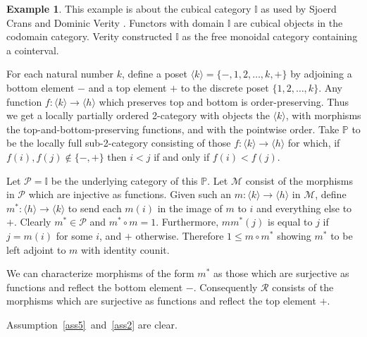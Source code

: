 \documentclass[a4paper,12pt,reqno]{amsart}
\theoremstyle{definition}
\newtheorem{example}[theorem]{Example}
\theoremstyle{fact}
\theoremstyle{genquest}
\theoremstyle{step}
\newcommand{\ra}{\rightarrow}
\def\CM{{\mathscr M}}
\def\CP{{\mathscr P}}
\def\CR{{\mathscr R}}
\begin{document}
\begin{example}\label{Ex3+}
This example is about the cubical category $\mathbb{I}$ as used by Sjoerd Crans \cite{CransThesis} and Dominic Verity \cite{LDTHOC, Verity07}. 
Functors with domain $\mathbb{I}$ are cubical objects in the codomain category. 
Verity constructed $\mathbb{I}$ as the free monoidal category containing a cointerval.

For each natural number $k$, define a poset $\langle k\rangle = \{-,1,2,\dots ,k,+\}$ 
by adjoining a bottom element $-$ and a top element $+$ to the discrete poset $\{1,2,\dots ,k\}$.
Any function $f : \langle k\rangle \ra \langle h\rangle$ which preserves top and bottom is order-preserving.
Thus we get a locally partially ordered 2-category with objects the $\langle k\rangle$, 
with morphisms the top-and-bottom-preserving functions, and with the pointwise order. Take $\mathbb{P}$ to be the locally full sub-2-category
consisting of those $f:\langle k\rangle \ra \langle h\rangle$ for which,
if $f(i),f(j)\notin \{-,+\}$ then $i<j$ if and only if $f(i)<f(j)$. 

Let $\CP = \mathbb{I}$ be the underlying category of this $\mathbb{P}$.
Let $\CM$ consist of the morphisms in $\CP$ which are injective as functions. Given such an $m : \langle k\rangle \ra \langle h\rangle$ in $\CM$,
define $m^* : \langle h\rangle \ra \langle k\rangle$ to send each $m(i)$
in the image of $m$ to $i$ and everything else to $+$. 
Clearly $m^*\in \CP$ and $m^*\circ m = 1$.
Furthermore, $mm^*(j)$ is equal to $j$ if $j=m(i)$ for some $i$, and $+$ otherwise.
Therefore $1\le m\circ m^*$ showing $m^*$ to be left adjoint to $m$
with identity counit.

We can characterize morphisms of the form $m^*$ as those which are surjective as functions and reflect the bottom element $-$.
Consequently $\CR$ consists of the morphisms which are surjective as
functions and reflect the top element $+$.

Assumption~\ref{ass5}~and~\ref{ass2} are clear. 


\end{example}
\end{document}
